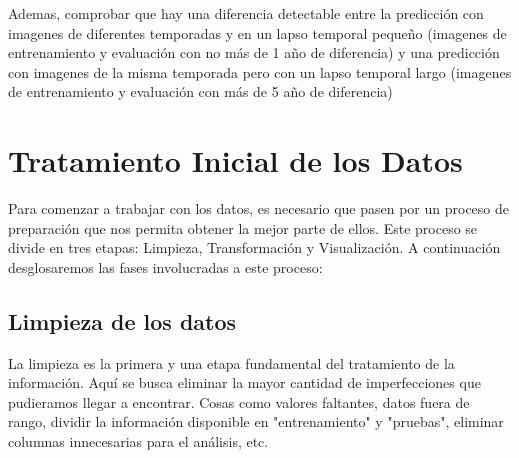 \documentclass{article}
\begin{document}
Ademas, comprobar que hay una diferencia detectable entre la predicción con imagenes de diferentes temporadas y en un lapso temporal pequeño (imagenes de entrenamiento y evaluación con no más de 1 año de diferencia) y una predicción con imagenes de la misma temporada pero con un lapso temporal largo (imagenes de entrenamiento y evaluación con más de 5 año de diferencia)

\section{Tratamiento Inicial de los Datos}

Para comenzar a trabajar con los datos, es necesario que pasen por un proceso de preparación que nos permita obtener la mejor parte de ellos. Este proceso se divide en tres etapas: Limpieza, Transformación y Visualización. A continuación desglosaremos las fases involucradas a este proceso:

    \subsection{Limpieza de los datos}

        La limpieza es la primera y una etapa fundamental del tratamiento de la información. Aquí se busca eliminar la mayor cantidad de imperfecciones que pudieramos llegar a encontrar. Cosas como valores faltantes, datos fuera de rango, dividir la información disponible en "entrenamiento" y "pruebas", eliminar columnas innecesarias para el análisis, etc.\\
\end{document}

